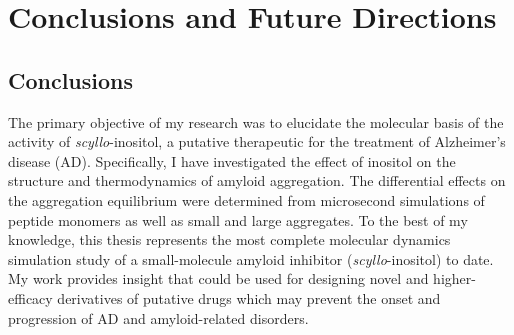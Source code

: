 

\chapter{Conclusions and Future Directions}
\section{Conclusions}


The primary objective of my research was to elucidate the molecular basis of the activity of \textit{scyllo}-inositol, a putative therapeutic for the treatment of Alzheimer's disease (AD). Specifically, I have investigated the effect of inositol on the structure and thermodynamics of amyloid aggregation. The differential effects on the aggregation equilibrium were determined from microsecond simulations of peptide monomers as well as small and large aggregates.
To the best of my knowledge, this thesis represents the most complete molecular dynamics simulation study of a small-molecule amyloid inhibitor (\textit{scyllo}-inositol) to date.
My work provides insight that could be used for designing novel and higher-efficacy derivatives of putative drugs which may prevent the onset and progression of AD and amyloid-related disorders.

